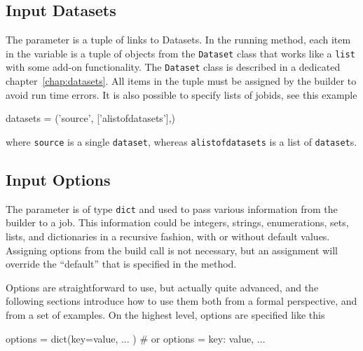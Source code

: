 \subsection*{Input Datasets}
The \datasets parameter is a tuple of links to Datasets.  In the
running method, each item in the \datasets variable is a tuple of
objects from the \texttt{Dataset} class that works like
a \texttt{list} with some add-on functionality.  The \texttt{Dataset}
class is described in a dedicated chapter~\ref{chap:datasets}.
All items in the \datasets tuple must be assigned by the builder to
avoid run time errors.
It is also possible to specify lists of jobids, see this example
\begin{python}
datasets = ('source', ['alistofdatasets'],)
\end{python}
where \texttt{source} is a single \texttt{dataset}, whereas
\texttt{alistofdatasets} is a list of \texttt{dataset}s.




\subsection*{Input Options}

The \options parameter is of type \texttt{dict} and used to pass
various information from the builder to a job.  This information could
be integers, strings, enumerations, sets, lists, and dictionaries in a
recursive fashion, with or without default values.  Assigning options
from the build call is not necessary, but an assignment will override
the ``default'' that is specified in the method.

Options are straightforward to use, but actually quite advanced, and
the following sections introduce how to use them both from a formal
perspective, and from a set of examples.  On the highest level,
options are specified like this
\begin{python}
  options = dict(key=value, ... )  # or
  options = {key: value, ...}
\end{python}


